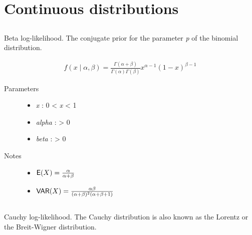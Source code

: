 \documentclass[]{jss}
\begin{document}
\section{Continuous distributions}


\subsection[beta]{ }

Beta log-likelihood. The conjugate prior for the parameter \emph{p} of the binomial distribution.

\begin{eqnarray*}
    f(x \mid \alpha, \beta) = \frac{\Gamma(\alpha + \beta)}{\Gamma(\alpha) \Gamma(\beta)} x^{\alpha - 1} (1 - x)^{\beta - 1}
\end{eqnarray*}

\begin{description}
\item[Parameters] \leavevmode\begin{itemize}
\item {} 
\emph{x} : 0 \textless{} \emph{x} \textless{} 1

\item {} 
\emph{alpha} : \textgreater{} 0

\item {} 
\emph{beta} : \textgreater{} 0

\end{itemize}


\item[Notes]\leavevmode\begin{itemize}
\item {} 
$\mathsf{E}(X)=\frac{\alpha}{\alpha+\beta}$

\item {} 
$\mathsf{VAR}(X)=\frac{\alpha \beta}{(\alpha+\beta)^2(\alpha+\beta+1)}$

\end{itemize}

\end{description}


\subsection[Cauchy]{}


Cauchy log-likelihood. The Cauchy distribution is also known as the
Lorentz or the Breit-Wigner distribution.
\end{document}
